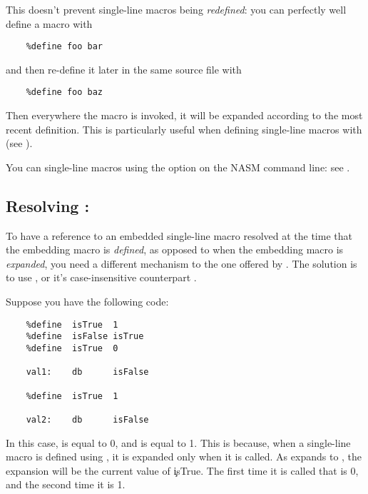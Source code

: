 This doesn't prevent single-line macros being \emph{redefined}:
you can perfectly well define a macro with

\begin{lstlisting}
	%define foo bar
\end{lstlisting}

and then re-define it later in the same source file with

\begin{lstlisting}
	%define foo baz
\end{lstlisting}

Then everywhere the macro  is invoked, it will be expanded
according to the most recent definition. This is particularly useful
when defining single-line macros with 
(see ).

You can  single-line macros using the 
option on the NASM command line: see .

\subsection{Resolving : }
\label{subsec:xdefine}

To have a reference to an embedded single-line macro resolved at the
time that the embedding macro is \emph{defined}, as opposed to when the
embedding macro is \emph{expanded}, you need a different mechanism to the
one offered by . The solution is to use , or
it's case-insensitive counterpart .

Suppose you have the following code:

\begin{lstlisting}
	%define  isTrue  1
	%define  isFalse isTrue
	%define  isTrue  0

	val1:    db      isFalse

	%define  isTrue  1

	val2:    db      isFalse
\end{lstlisting}

In this case,  is equal to 0, and  is equal to 1.
This is because, when a single-line macro is defined using ,
it is expanded only when it is called. As  expands to ,
the expansion will be the current value of \c{isTrue}. The first time it is called
that is 0, and the second time it is 1.

